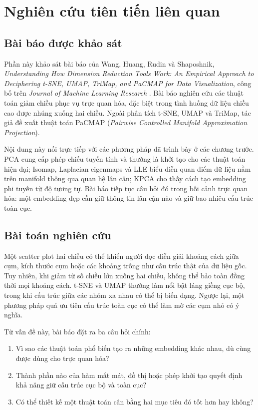 \section{Nghiên cứu tiên tiến liên quan}
\label{sec:related-research}

\subsection{Bài báo được khảo sát}

Phần này khảo sát bài báo của Wang, Huang, Rudin và Shaposhnik,
\textit{Understanding How Dimension Reduction Tools Work: An Empirical
Approach to Deciphering t-SNE, UMAP, TriMap, and PaCMAP for Data
Visualization}, công bố trên \textit{Journal of Machine Learning Research}
\cite{wang2021pacmap}. Bài báo nghiên cứu các thuật toán giảm chiều phục
vụ trực quan hóa, đặc biệt trong tình huống dữ liệu chiều cao được nhúng
xuống hai chiều. Ngoài phân tích t-SNE, UMAP và TriMap, tác giả đề xuất
thuật toán PaCMAP (\textit{Pairwise Controlled Manifold Approximation
Projection}).

Nội dung này nối trực tiếp với các phương pháp đã trình bày ở các chương
trước. PCA cung cấp phép chiếu tuyến tính và thường là khởi tạo cho các
thuật toán hiện đại; Isomap, Laplacian eigenmaps và LLE biểu diễn quan điểm
dữ liệu nằm trên manifold thông qua quan hệ lân cận; KPCA cho thấy cách tạo
embedding phi tuyến từ độ tương tự. Bài báo tiếp tục câu hỏi đó trong bối
cảnh trực quan hóa: một embedding đẹp cần giữ thông tin lân cận nào và giữ
bao nhiêu cấu trúc toàn cục.

\subsection{Bài toán nghiên cứu}

Một scatter plot hai chiều có thể khiến người đọc diễn giải khoảng cách
giữa cụm, kích thước cụm hoặc các khoảng trống như cấu trúc thật của dữ
liệu gốc. Tuy nhiên, khi giảm từ số chiều lớn xuống hai chiều, không thể
bảo toàn đồng thời mọi khoảng cách. t-SNE và UMAP thường làm nổi bật láng
giềng cục bộ, trong khi cấu trúc giữa các nhóm xa nhau có thể bị biến dạng.
Ngược lại, một phương pháp quá ưu tiên cấu trúc toàn cục có thể làm mờ các
cụm nhỏ có ý nghĩa.

Từ vấn đề này, bài báo đặt ra ba câu hỏi chính:
\begin{enumerate}
  \item Vì sao các thuật toán phổ biến tạo ra những embedding khác nhau,
  dù cùng được dùng cho trực quan hóa?
  \item Thành phần nào của hàm mất mát, đồ thị hoặc phép khởi tạo quyết định
  khả năng giữ cấu trúc cục bộ và toàn cục?
  \item Có thể thiết kế một thuật toán cân bằng hai mục tiêu đó tốt hơn hay
  không?
\end{enumerate}


